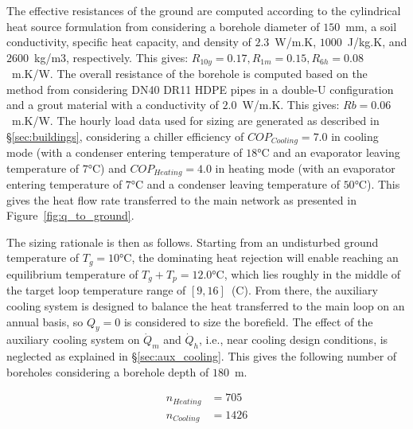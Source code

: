 The effective resistances of the ground are computed according to the cylindrical heat source formulation from \cite{Carslaw1947} considering a borehole diameter of $150$~mm, a soil conductivity, specific heat capacity, and density of $2.3$~W/m.K, $1000$~J/kg.K, and $2600$~kg/m3, respectively.
This gives: $R_{10y} = 0.17, R_{1m} = 0.15, R_{6h} = 0.08$~m.K/W.
The overall resistance of the borehole is computed based on the method from \cite{Kavanaugh2014} considering DN40 DR11 HDPE pipes in a double-U configuration and a grout material with a conductivity of $2.0$~W/m.K. This gives: $Rb = 0.06$~m.K/W.
The hourly load data used for sizing are generated as described in §\ref{sec:buildings}, considering a chiller efficiency of $COP_{Cooling} = 7.0$ in cooling mode (with a condenser entering temperature of $18$°C and an evaporator leaving temperature of $7$°C) and $COP_{Heating} = 4.0$ in heating mode (with an evaporator entering temperature of $7$°C and a condenser leaving temperature of $50$°C). This gives the heat flow rate transferred to the main network as presented in Figure~\ref{fig:q_to_ground}.

The sizing rationale is then as follows. Starting from an undisturbed ground temperature of $T_g = 10$°C, the dominating heat rejection will enable reaching an equilibrium temperature of $T_g + T_p = 12.0$°C, which lies roughly in the middle of the target loop temperature range of $[9, 16]$~(C).
From there, the auxiliary cooling system is designed to balance the heat transferred to the main loop on an annual basis, so $Q_y = 0$ is considered to size the borefield. The effect of the auxiliary cooling system on $\dot{Q}_m$ and $\dot{Q}_h$, i.e., near cooling design conditions, is neglected as explained in §\ref{sec:aux_cooling}.
This gives the following number of boreholes considering a borehole depth of $180$~m.

\begin{align*}
n_{Heating} &= 705 \\
n_{Cooling} &= 1426
\end{align*}


